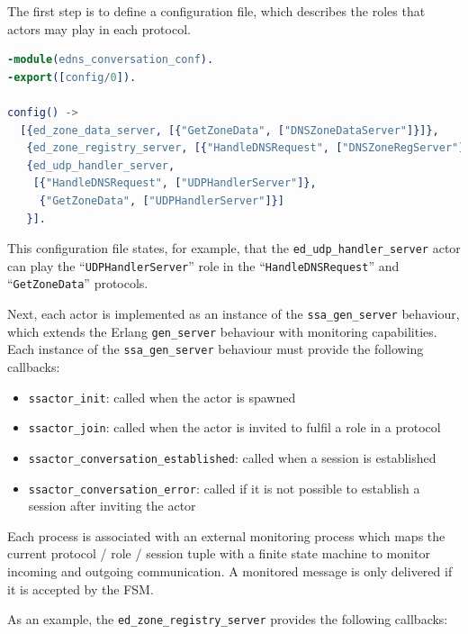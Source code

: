 \documentclass[a4paper]{article}
\begin{document}
The first step is to define a configuration file, which describes the roles that actors may play in each protocol.

\begin{lstlisting}[language=erlang]
-module(edns_conversation_conf).
-export([config/0]).

config() ->
  [{ed_zone_data_server, [{"GetZoneData", ["DNSZoneDataServer"]}]},
   {ed_zone_registry_server, [{"HandleDNSRequest", ["DNSZoneRegServer"]}]},
   {ed_udp_handler_server,
    [{"HandleDNSRequest", ["UDPHandlerServer"]},
     {"GetZoneData", ["UDPHandlerServer"]}]
   }].
\end{lstlisting}

This configuration file states, for example, that the \texttt{ed\_udp\_handler\_server} actor can play the ``\texttt{UDPHandlerServer}'' role in the ``\texttt{HandleDNSRequest}'' and ``\texttt{GetZoneData}'' protocols.

Next, each actor is implemented as an instance of the \texttt{ssa\_gen\_server} behaviour, which extends the Erlang \texttt{gen\_server} behaviour with monitoring capabilities. Each instance of the \texttt{ssa\_gen\_server} behaviour must provide the following callbacks:

\begin{itemize}
\item \texttt{ssactor\_init}: called when the actor is spawned
\item \texttt{ssactor\_join}: called when the actor is invited to fulfil a role in a protocol
\item \texttt{ssactor\_conversation\_established}: called when a session is established
\item \texttt{ssactor\_conversation\_error}: called if it is not possible to establish a session after inviting the actor
\end{itemize}

Each process is associated with an external monitoring process which maps the current protocol / role / session tuple with a finite state machine to monitor incoming and outgoing communication. A monitored message is only delivered if it is accepted by the FSM.

As an example, the \texttt{ed\_zone\_registry\_server} provides the following callbacks:
\end{document}
